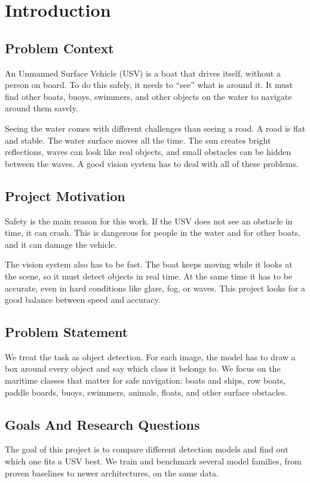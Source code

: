 \documentclass[11pt,a4paper]{article}
\begin{document}
\section{Introduction}

\subsection{Problem Context}
An Unmanned Surface Vehicle (USV) is a boat that drives itself, without a
person on board. To do this safely, it needs to ``see'' what is around it. It
must find other boats, buoys, swimmers, and other objects on the water to navigate around them savely.

Seeing the water comes with different challenges than seeing a road. A road is flat and stable. The
water surface moves all the time. The sun creates bright reflections, waves can
look like real objects, and small obstacles can be hidden between the waves.
A good vision system has to deal with all of these problems.

\subsection{Project Motivation}
Safety is the main reason for this work. If the USV does not see an obstacle in
time, it can crash. This is dangerous for people in the water and for other
boats, and it can damage the vehicle.

The vision system also has to be fast. The boat keeps moving while it looks at
the scene, so it must detect objects in real time. At the same time it has to be accurate, even in hard conditions like glare, fog, or
waves. This project looks for a good balance between speed and accuracy.

\subsection{Problem Statement}
We treat the task as object detection. For each image, the model has to draw a
box around every object and say which class it belongs to. We focus on the
maritime classes that matter for safe navigation: boats and ships, row boats,
paddle boards, buoys, swimmers, animals, floats, and other surface obstacles.

\subsection{Goals And Research Questions}
The goal of this project is to compare different detection models and find out
which one fits a USV best. We train and benchmark several model families,
from proven baselines to newer architectures, on the same data.
\end{document}
